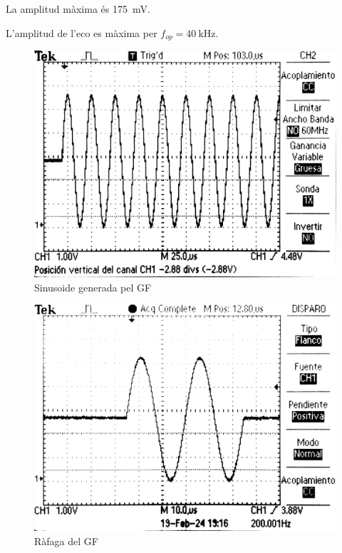 \documentclass[catalan, a4paper, nobib]{tufte-handout}
\begin{document}
 La amplitud màxima és \qty{175}{\milli\volt}.

 L'amplitud de l'eco es màxima per $f_{op}=\qty{40}{\kilo\hertz}$.

\begin{figure}
  \includegraphics[width=\linewidth]{foto1.png}
  \caption{Sinusoide generada pel GF}
  \label{fig:foto1}
\end{figure}

\begin{figure}
  \includegraphics[width=\linewidth]{foto2.png}
  \caption{Ràfaga del GF}
  \label{fig:foto2}
\end{figure}
\end{document}
